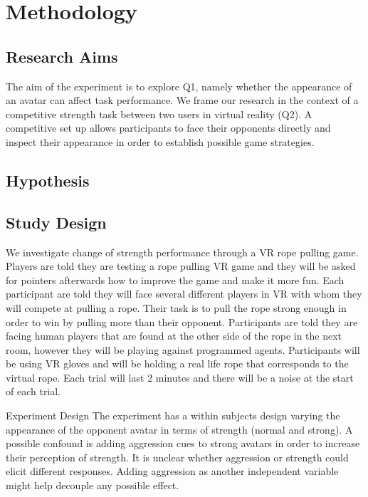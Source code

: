 
\section{Methodology}
\subsection{Research Aims}
The aim of the experiment is to explore Q1, namely whether the appearance of an avatar can affect task performance. We frame our research in the context of a competitive strength task between two users in virtual reality (Q2). A competitive set up allows participants to face their opponents directly and inspect their appearance in order to establish possible game strategies.
\subsection{Hypothesis}
\subsection{Study Design}
We investigate change of strength performance through a VR rope pulling game. Players are told they are testing a rope pulling VR game and they will be asked for pointers afterwards how to improve the game and make it more fun. 
Each participant are told they will face several different players in VR with whom they will compete at pulling a rope. Their task is to pull the rope strong enough in order to win by pulling more than their opponent. Participants are told they are facing human players that are found at the other side of the rope in the next room, however they will be playing against programmed agents. Participants will be using VR gloves and will be holding a real life rope that corresponds to the virtual rope. Each trial will last 2 minutes and there will be a noise at the start of each trial.


Experiment Design
The experiment has a within subjects design varying the appearance of the opponent avatar in terms of strength (normal and strong). A possible confound is adding aggression cues to strong avatars in order to increase their perception of strength. It is unclear whether aggression or strength could elicit different responses. Adding aggression as another independent variable might help decouple any possible effect.

